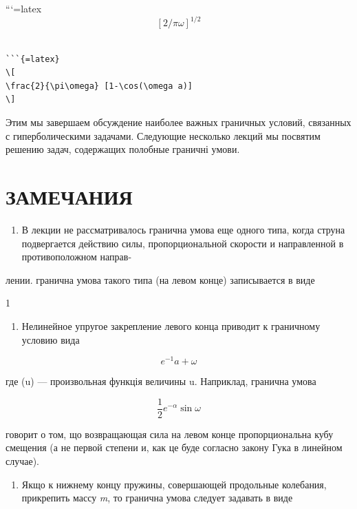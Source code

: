\documentclass[
  ukrainian,
]{article}
\providecommand{\tightlist}{%
  \setlength{\itemsep}{0pt}\setlength{\parskip}{0pt}}
\begin{document}
```{=latex}
\[
[2/\pi\omega]^{1/2}
\]

\begin{verbatim}

```{=latex}
\[
\frac{2}{\pi\omega} [1-\cos(\omega a)]
\]
\end{verbatim}

Этим мы завершаем обсуждение наиболее важных граничных условий,
связанных с гиперболическими задачами. Следующие несколько лекций мы
посвятим решению задач, содержащих полобные граничні умови.

\section{ЗАМЕЧАНИЯ}\label{ux437ux430ux43cux435ux447ux430ux43dux438ux44f-1}

\begin{enumerate}
\def\labelenumi{\arabic{enumi}.}
\tightlist
\item
  В лекции не рассматривалось гранична умова еще одного типа, когда
  струна подвергается действию силы, пропорциональной скорости и
  направленной в противоположном направ-
\end{enumerate}

лении. гранична умова такого типа (на левом конце) записывается в виде

1

\begin{enumerate}
\def\labelenumi{\arabic{enumi}.}
\setcounter{enumi}{1}
\tightlist
\item
  Нелинейное упругое закрепление левого конца приводит к граничному
  условию вида
\end{enumerate}

\[
e^{-1}a + \omega
\]

где \varphi(u) --- произвольная функція величины u. Наприклад, гранична
умова

\[
\frac{1}{2}e^{-\alpha}\sin\omega
\]

говорит о том, що возвращающая сила на левом конце пропорциональна кубу
смещения (а не первой степени и, как це буде согласно закону Гука в
линейном случае).

\begin{enumerate}
\def\labelenumi{\arabic{enumi}.}
\setcounter{enumi}{2}
\tightlist
\item
  Якщо к нижнему концу пружины, совершающей продольные колебания,
  прикрепить массу \emph{m}, то гранична умова следует задавать в виде
\end{enumerate}
\end{document}
